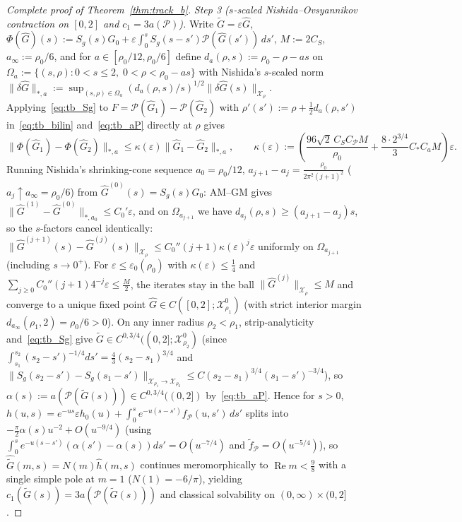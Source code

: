 \documentclass[11pt,a4paper]{article}
\begin{document}
\begin{proof}[Complete proof of Theorem~\ref{thm:track_b}]
\emph{Step 3 ($s$-scaled Nishida--Ovsyannikov contraction on $[0,2]$ and $c_1=3a(\mathcal{P})$).}
Write $\widetilde G=\varepsilon\hat G$, $\Phi(\hat G)(s):=S_g(s)G_0+\varepsilon\int_0^s S_g(s-s')\mathcal{P}(\hat G(s'))\,ds'$, $M:=2C_S$, $a_\infty:=\rho_0/6$, and for $a\in[\rho_0/12,\rho_0/6]$ define $d_a(\rho,s):=\rho_0-\rho-as$ on $\Omega_a:=\{(s,\rho):0<s\le 2,\;0<\rho<\rho_0-as\}$ with Nishida's $s$-scaled norm $\|\delta\hat G\|_{*,a}:=\sup_{(s,\rho)\in\Omega_a}(d_a(\rho,s)/s)^{1/2}\|\delta\hat G(s)\|_{\mathcal{X}_\rho}$.
Applying~\eqref{eq:tb_Sg} to $F=\mathcal{P}(\hat G_1)-\mathcal{P}(\hat G_2)$ with $\rho'(s'):=\rho+\tfrac12 d_a(\rho,s')$ in~\eqref{eq:tb_bilin} and~\eqref{eq:tb_aP} directly at $\rho$ gives
\[
\|\Phi(\hat G_1)-\Phi(\hat G_2)\|_{*,a}\le \kappa(\varepsilon)\|\hat G_1-\hat G_2\|_{*,a},\qquad
\kappa(\varepsilon):=\left(\frac{96\sqrt{2}\,C_S C_{\mathcal{P}} M}{\rho_0}+\frac{8\cdot 2^{3/4}}{3}C_* C_a M\right)\varepsilon.
\]
Running Nishida's shrinking-cone sequence $a_0=\rho_0/12$, $a_{j+1}-a_j=\frac{\rho_0}{2\pi^2(j+1)^2}$ ($a_j\uparrow a_\infty=\rho_0/6$) from $\hat G^{(0)}(s)=S_g(s)G_0$: AM--GM gives $\|\hat G^{(1)}-\hat G^{(0)}\|_{*,a_0}\le C_0'\varepsilon$, and on $\Omega_{a_{j+1}}$ we have $d_{a_j}(\rho,s)\ge(a_{j+1}-a_j)s$, so the $s$-factors cancel identically:
$\|\hat G^{(j+1)}(s)-\hat G^{(j)}(s)\|_{\mathcal{X}_\rho}\le C_0''(j+1)\kappa(\varepsilon)^j\varepsilon$ uniformly on $\Omega_{a_{j+1}}$ (including $s\to 0^+$).
For $\varepsilon\le\varepsilon_0(\rho_0)$ with $\kappa(\varepsilon)\le\tfrac14$ and $\sum_{j\ge 0}C_0''(j+1)4^{-j}\varepsilon\le\tfrac{M}{2}$, the iterates stay in the ball $\|\hat G^{(j)}\|_{\mathcal{X}_\rho}\le M$ and converge to a unique fixed point $\hat G\in C([0,2];\mathcal{X}_{\rho_1}^0)$ (with strict interior margin $d_{a_\infty}(\rho_1,2)=\rho_0/6>0$).
On any inner radius $\rho_2<\rho_1$, strip-analyticity and~\eqref{eq:tb_Sg} give $\widetilde G\in C^{0,3/4}((0,2];\mathcal{X}_{\rho_2}^0)$ (since $\int_{s_1}^{s_2}(s_2-s')^{-1/4}ds'=\tfrac43(s_2-s_1)^{3/4}$ and $\|S_g(s_2-s')-S_g(s_1-s')\|_{\mathcal{X}_{\rho_1}\to\mathcal{X}_{\rho_2}}\le C(s_2-s_1)^{3/4}(s_1-s')^{-3/4}$), so $\alpha(s):=a(\mathcal{P}(\widetilde G(s)))\in C^{0,3/4}((0,2])$ by~\eqref{eq:tb_aP}.
Hence for $s>0$, $h(u,s)=e^{-us}\varepsilon h_0(u)+\int_0^s e^{-u(s-s')}f_{\mathcal{P}}(u,s')\,ds'$ splits into $-\tfrac{\pi}{2}\alpha(s)u^{-2}+O(u^{-9/4})$ (using $\int_0^s e^{-u(s-s')}(\alpha(s')-\alpha(s))ds'=O(u^{-7/4})$ and $\tilde f_{\mathcal{P}}=O(u^{-5/4})$), so $\widehat{\widetilde G}(m,s)=N(m)\widehat h(m,s)$ continues meromorphically to $\operatorname{Re}m<\tfrac98$ with a single simple pole at $m=1$ ($N(1)=-6/\pi$), yielding $c_1(\widetilde G(s))=3a(\mathcal{P}(\widetilde G(s)))$ and classical solvability on $(0,\infty)\times(0,2]$.


\end{proof}
\end{document}

